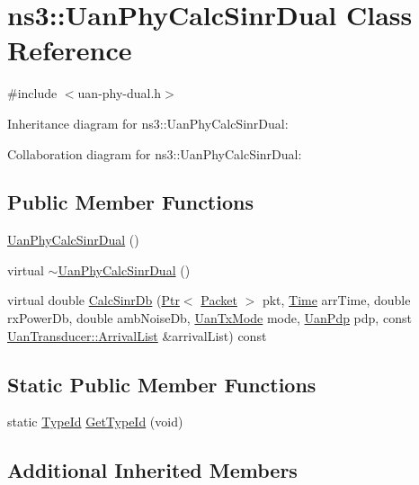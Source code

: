 \hypertarget{classns3_1_1UanPhyCalcSinrDual}{}\section{ns3\+:\+:Uan\+Phy\+Calc\+Sinr\+Dual Class Reference}
\label{classns3_1_1UanPhyCalcSinrDual}


{\ttfamily \#include $<$uan-\/phy-\/dual.\+h$>$}



Inheritance diagram for ns3\+:\+:Uan\+Phy\+Calc\+Sinr\+Dual\+:


Collaboration diagram for ns3\+:\+:Uan\+Phy\+Calc\+Sinr\+Dual\+:
\subsection*{Public Member Functions}
\begin{DoxyCompactItemize}
\item 
\hyperlink{classns3_1_1UanPhyCalcSinrDual_a2337f6ba5f2f122f643f314150dc65cc}{Uan\+Phy\+Calc\+Sinr\+Dual} ()
\item 
virtual \hyperlink{classns3_1_1UanPhyCalcSinrDual_a9d687d98e63867da32783fa6df1bad8b}{$\sim$\+Uan\+Phy\+Calc\+Sinr\+Dual} ()
\item 
virtual double \hyperlink{classns3_1_1UanPhyCalcSinrDual_a79c7ea15803777ba117f33eafec649b3}{Calc\+Sinr\+Db} (\hyperlink{classns3_1_1Ptr}{Ptr}$<$ \hyperlink{classns3_1_1Packet}{Packet} $>$ pkt, \hyperlink{classns3_1_1Time}{Time} arr\+Time, double rx\+Power\+Db, double amb\+Noise\+Db, \hyperlink{classns3_1_1UanTxMode}{Uan\+Tx\+Mode} mode, \hyperlink{classns3_1_1UanPdp}{Uan\+Pdp} pdp, const \hyperlink{classns3_1_1UanTransducer_a95332a21e30506421a116d4b5c4dfd75}{Uan\+Transducer\+::\+Arrival\+List} \&arrival\+List) const 
\end{DoxyCompactItemize}
\subsection*{Static Public Member Functions}
\begin{DoxyCompactItemize}
\item 
static \hyperlink{classns3_1_1TypeId}{Type\+Id} \hyperlink{classns3_1_1UanPhyCalcSinrDual_a235697c503bf5805c1fcb0364ac3f2ed}{Get\+Type\+Id} (void)
\end{DoxyCompactItemize}
\subsection*{Additional Inherited Members}


